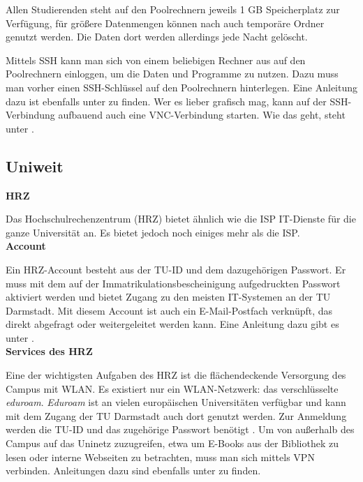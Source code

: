 {    Allen Studierenden steht auf den Poolrechnern jeweils 1 GB Speicherplatz zur Verfügung, für größere Datenmengen können nach \footnotemark[4] auch temporäre Ordner genutzt werden. Die Daten dort werden allerdings jede Nacht gelöscht.

    Mittels SSH \footnotemark[5] kann man sich von einem beliebigen Rechner aus auf den Poolrechnern einloggen, um die Daten und Programme zu nutzen. Dazu muss man vorher einen SSH-Schlüssel auf den Poolrechnern hinterlegen. Eine Anleitung dazu ist ebenfalls unter \footnotemark[5] zu finden.
    Wer es lieber grafisch mag, kann auf der SSH-Verbindung aufbauend auch eine VNC-Verbindung starten. Wie das geht, steht unter \footnotemark[6].\\

    \subsection*{Uniweit}

    \noindent\textbf{HRZ}

    Das Hochschulrechenzentrum (HRZ) \footnotemark[10] bietet ähnlich wie die ISP IT-Dienste für die ganze Universität an. Es bietet jedoch noch einiges mehr als die ISP.\\

    \noindent\textbf{Account}

    Ein HRZ-Account besteht aus der TU-ID und dem dazugehörigen Passwort. Er muss mit dem auf der Immatrikulationsbescheinigung aufgedruckten Passwort aktiviert werden und bietet Zugang zu den meisten IT-Systemen an der TU Darmstadt. Mit diesem Account ist auch ein E-Mail-Postfach verknüpft, das direkt abgefragt oder weitergeleitet werden kann. Eine Anleitung dazu gibt es unter \footnotemark[11].\\

    \noindent\textbf{Services des HRZ}

    Eine der wichtigsten Aufgaben des HRZ ist die flächendeckende Versorgung des Campus mit WLAN. Es existiert nur ein WLAN-Netzwerk: das verschlüsselte \emph{eduroam}. \emph{Eduroam} ist an vielen europäischen Universitäten verfügbar und kann mit dem Zugang der TU Darmstadt auch dort genutzt werden. Zur Anmeldung werden die TU-ID und das zugehörige Passwort benötigt \footnotemark[12]. Um von außerhalb des Campus auf das Uninetz zuzugreifen, etwa um E-Books aus der Bibliothek zu lesen oder interne Webseiten zu betrachten, muss man sich mittels VPN verbinden. Anleitungen dazu sind ebenfalls unter \footnotemark[12] zu finden.

}

